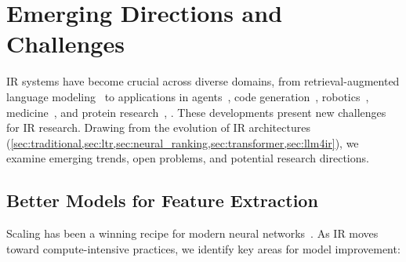\section{Emerging Directions and Challenges}
\label{sec:future_direction}

IR systems have become crucial across diverse domains, from retrieval-augmented language modeling~\cite{Khandelwal2020Generalization,borgeaud2022improving} to applications in agents~\cite{wu2023autogen,wang2024llmagentsurvey}, code generation~\cite{wang2024coderag,zhang-etal-2023-repocoder}, robotics~\cite{anwar2024remembr}, medicine~\cite{jeong2024improving}, and protein research~\cite{jumper2021highly}, \interalia. These developments present new challenges for IR research. Drawing from the evolution of IR architectures (\cref{sec:traditional,sec:ltr,sec:neural_ranking,sec:transformer,sec:llm4ir}), we examine emerging trends, open problems, and potential research directions.

\subsection{Better Models for Feature Extraction}
\label{subsec:direction_backbone}

Scaling has been a winning recipe for modern neural networks~\cite[\interalia]{kaplan2020scaling,hoffmann2022training,dehghani2023scaling,fang2024scaling,shao2024scaling}. 
As IR moves toward compute-intensive practices, we identify key areas for model improvement:

